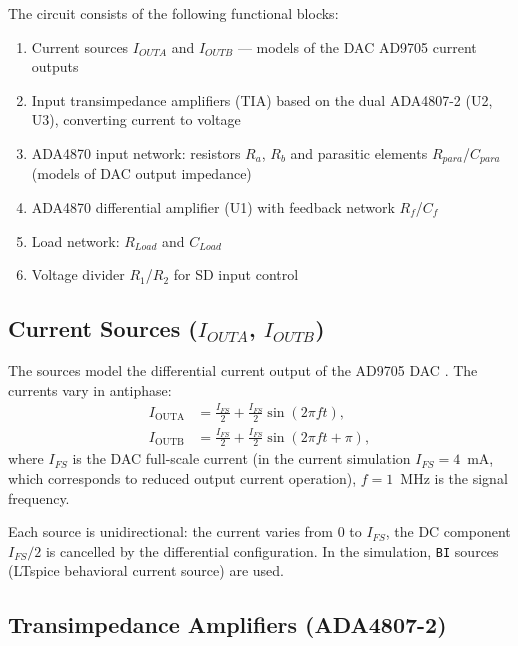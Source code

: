 \documentclass[a4paper, 12pt]{article}
\begin{document}
The circuit consists of the following functional blocks:
\begin{enumerate}
  \item Current sources \(I_{OUTA}\) and \(I_{OUTB}\) --- models of the DAC AD9705 current outputs
  \item Input transimpedance amplifiers (TIA) based on the dual ADA4807-2 (U2, U3), converting current to voltage
  \item ADA4870 input network: resistors \(R_{a}\), \(R_{b}\) and parasitic elements
        \(R_{para}\)/\(C_{para}\) (models of DAC output impedance)
  \item ADA4870 differential amplifier (U1) with feedback network \(R_f\)/\(C_f\)
  \item Load network: \(R_{Load}\) and \(C_{Load}\)
  \item Voltage divider \(R_1\)/\(R_2\) for SD input control
\end{enumerate}

\subsection{Current Sources \texorpdfstring{(\(I_{OUTA}\), \(I_{OUTB}\))}{{(IOUTA, IOUTB)}}}

The sources model the differential current output of the AD9705 DAC
\cite{AD9705_ds}. The currents vary in antiphase:
\begin{align}
  I_{\text{OUTA}} &= \frac{I_{FS}}{2}
    + \frac{I_{FS}}{2}\sin(2\pi f t),
    \label{eq:iouta}\\
  I_{\text{OUTB}} &= \frac{I_{FS}}{2}
    + \frac{I_{FS}}{2}\sin(2\pi f t + \pi),
    \label{eq:ioutb}
\end{align}
where $I_{FS}$ is the DAC full-scale current (in the current simulation $I_{FS}=4$~mA,
which corresponds to reduced output current operation),
$f = 1$~MHz is the signal frequency.

Each source is unidirectional: the current varies from 0 to $I_{FS}$, the DC component
$I_{FS}/2$ is cancelled by the differential configuration.
In the simulation, \texttt{BI} sources (LTspice behavioral current source) are used.

\subsection{Transimpedance Amplifiers (ADA4807-2)}
\end{document}
